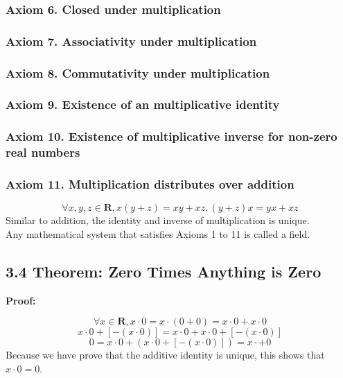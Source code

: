 \documentclass{article}
\begin{document}
\subsubsection*{Axiom 6. Closed under multiplication}
\subsubsection*{Axiom 7. Associativity under multiplication}
\subsubsection*{Axiom 8. Commutativity under multiplication}
\subsubsection*{Axiom 9. Existence of an multiplicative identity}
\subsubsection*{Axiom 10. Existence of multiplicative inverse for non-zero real numbers}
\subsubsection*{Axiom 11. Multiplication distributes over addition}
\begin{equation*}
    \forall x, y, z \in \mathbf{R}, x(y+z) = xy + xz, (y+z)x = yx + xz
\end{equation*}
Similar to addition, the identity and inverse of multiplication is unique.\\
Any mathematical system that satisfies Axioms 1 to 11 is called a field.
\subsection*{3.4 Theorem: Zero Times Anything is Zero}
\textbf{Proof:}
\begin{addmargin}[1em]{0em}
    \begin{equation*}
        \forall x \in \mathbf{R}, x\cdot 0 = x\cdot (0 + 0) = x\cdot 0 + x\cdot 0 \tag*{Axiom 4, 11}
    \end{equation*}
    \begin{equation*}
        x\cdot 0 + [-(x\cdot 0)] = x\cdot 0 + x\cdot 0 + [-(x\cdot 0)] \tag*{Axiom 5}
    \end{equation*}
    \begin{equation*}
        0 = x\cdot 0 + (x\cdot 0 + [-(x\cdot 0)]) = x\cdot + 0 \tag*{Axiom 2}
    \end{equation*}
    Because we have prove that the additive identity is unique, this shows that $x\cdot 0 = 0$.
\end{addmargin}
\end{document}
